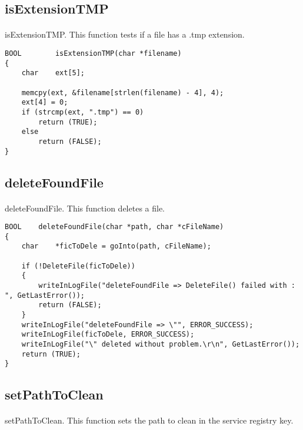 \documentclass{article}
\begin{document}
\subsection{isExtensionTMP}
\paragraph{}
isExtensionTMP. This function tests if a file has a .tmp extension.
\begin{lstlisting}
BOOL		isExtensionTMP(char *filename)
{
	char	ext[5];

	memcpy(ext, &filename[strlen(filename) - 4], 4);
	ext[4] = 0;
	if (strcmp(ext, ".tmp") == 0)
		return (TRUE);
	else
		return (FALSE);
}
\end{lstlisting}

\subsection{deleteFoundFile}
\paragraph{}
deleteFoundFile. This function deletes a file.
\begin{lstlisting}
BOOL	deleteFoundFile(char *path, char *cFileName)
{
	char	*ficToDele = goInto(path, cFileName);

	if (!DeleteFile(ficToDele))
	{
		writeInLogFile("deleteFoundFile => DeleteFile() failed with : ", GetLastError());
		return (FALSE);
	}
	writeInLogFile("deleteFoundFile => \"", ERROR_SUCCESS);
	writeInLogFile(ficToDele, ERROR_SUCCESS);
	writeInLogFile("\" deleted without problem.\r\n", GetLastError());
	return (TRUE);
}
\end{lstlisting}


\newpage
\subsection{setPathToClean}
\paragraph{}
setPathToClean. This function sets the path to clean in the service registry key.
\end{document}
